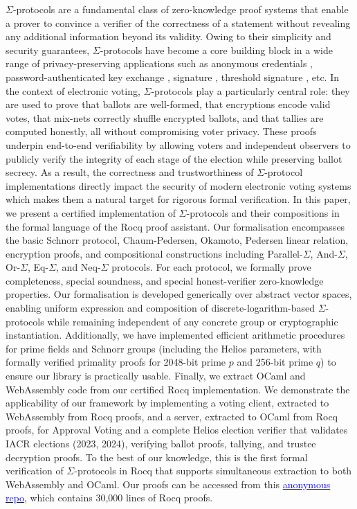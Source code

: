 \documentclass[sigconf,anonymous,review]{acmart}
\begin{document}
$\Sigma$-protocols are a fundamental class of zero-knowledge proof systems that enable a prover to convince a verifier of the correctness of a statement without revealing any additional information beyond its validity. Owing to their simplicity and security guarantees, $\Sigma$-protocols have become a core building block in a wide range of privacy-preserving applications such as anonymous credentials \cite{10.1145/2660267.2660328}, 
password-authenticated key exchange \cite{10.5555/2022815.2022838}, 
signature \cite{10.1007/0-387-34805-0_22}, threshold signature \cite{10.1007/978-3-030-81652-0_2}, etc. In the context of electronic voting, $\Sigma$-protocols play a particularly central role: they are used to prove that ballots are well-formed, that encryptions encode valid votes, that mix-nets correctly shuffle encrypted ballots, and that tallies are computed honestly, all without compromising voter privacy. These proofs underpin end-to-end verifiability by allowing voters and independent observers to publicly verify the integrity of each stage of the election while preserving ballot secrecy. As a result, the correctness and trustworthiness of $\Sigma$-protocol implementations directly impact the security of modern electronic voting systems which makes them a natural target for rigorous formal verification. In this paper, we present a certified implementation of $\Sigma$-protocols and their compositions in 
the formal language of the Rocq proof assistant. Our formalisation encompasses the basic Schnorr protocol, 
Chaum-Pedersen, Okamoto, Pedersen linear relation, encryption proofs, and compositional constructions including Parallel-$\Sigma$, 
And-$\Sigma$, Or-$\Sigma$, Eq-$\Sigma$, and Neq-$\Sigma$ protocols. For each protocol, we formally prove 
completeness, special soundness, and special honest-verifier zero-knowledge properties.
Our formalisation is developed 
generically over abstract vector spaces, enabling uniform expression and composition of discrete-logarithm-based 
$\Sigma$-protocols while remaining independent of any concrete group or cryptographic instantiation. Additionally, we have implemented efficient arithmetic procedures for prime fields and Schnorr groups (including the Helios parameters, 
with formally verified primality proofs for 2048-bit prime $p$ and 256-bit prime $q$) to 
ensure our library is practically usable. Finally, we extract OCaml and WebAssembly code from our certified 
Rocq implementation. We demonstrate the applicability of our framework by implementing a voting client, extracted to WebAssembly from Rocq proofs, and a server, extracted to OCaml from Rocq proofs, for Approval Voting and a complete Helios election verifier that validates IACR elections (2023, 2024), verifying ballot proofs, tallying, and trustee decryption proofs. To the best of our knowledge, this is the first formal verification of $\Sigma$-protocols in Rocq that supports simultaneous extraction to both WebAssembly and OCaml. Our proofs can be accessed from this \href{https://anonymous.4open.science/r/SigmaProtocol-EBA5/README.md}{\textcolor{blue}{anonymous repo}}, which contains 30,000 lines of Rocq proofs.
\end{document}
